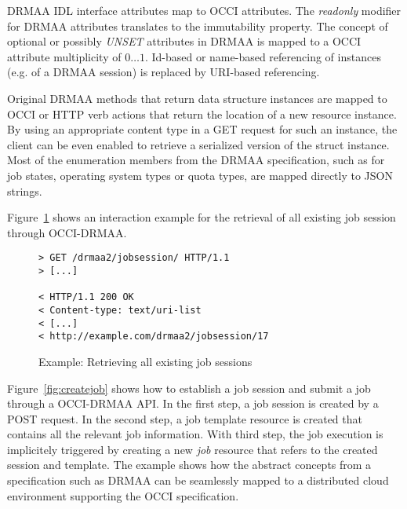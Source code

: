 \documentclass[twocolumn]{svjour3}       %
\begin{document}
DRMAA IDL interface attributes map to OCCI attributes. The \emph{readonly} modifier for DRMAA attributes translates to the immutability property. The concept of optional or possibly \emph{UNSET} attributes in DRMAA is mapped to a OCCI attribute multiplicity of $0\ldots1$. Id-based or name-based referencing of instances (e.g. of a DRMAA session) is replaced by URI-based referencing.

Original DRMAA methods that return data structure instances are mapped to OCCI or HTTP verb actions that return the location of a new resource instance. By using an appropriate content type in a GET request for such an instance, the client can be even enabled to retrieve a serialized version of the struct instance. Most of the enumeration members from the DRMAA specification, such as for job states, operating system types or quota types, are mapped directly to JSON strings. 

Figure~\ref{fig:getsessions} shows an interaction example for the retrieval of all existing job session through OCCI-DRMAA.

\begin{figure}
\begin{lstlisting}
> GET /drmaa2/jobsession/ HTTP/1.1
> [...]

< HTTP/1.1 200 OK 
< Content-type: text/uri-list
< [...]
< http://example.com/drmaa2/jobsession/17
\end{lstlisting}
\caption{Example: Retrieving all existing job sessions}
\label{fig:getsessions} 
\end{figure}

Figure~\ref{fig:createjob} shows how to establish a job session and submit a job through a OCCI-DRMAA API. In the first step, a job session is created by a POST request. In the second step, a job template resource is created that contains all the relevant job information. With third step, the job execution is implicitely triggered by creating a new \emph{job} resource that refers to the created session and template. The example shows how the abstract concepts from a specification such as DRMAA can be seamlessly mapped to a distributed cloud environment supporting the OCCI specification.
\end{document}
